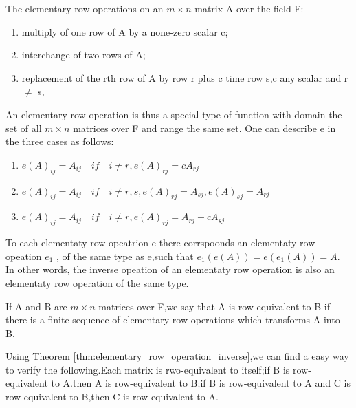 \begin{proposition}
The elementary row operations on an $m \times n$ matrix A over the field F:
\begin{enumerate}
	\item multiply of one row of A by a none-zero scalar c;
	\item interchange of two rows of A;
	\item replacement of the rth row of A by row r plus c time row s,c any scalar and r $\neq$ s,
\end{enumerate}
\end{proposition}
An elementary row operation is thus a special type of function with domain the set of all $m \times n$ matrices over F and range the same set.
One can describe e in the three cases as follows:
\begin{enumerate}
	\item $e(A)_{ij} = A_{ij} \quad if \quad  i \neq r ,e(A)_{rj} = cA_{rj}$
	\item $e(A)_{ij} = A_{ij} \quad if \quad  i \neq r,s ,e(A)_{rj} = A_{sj},e(A)_{sj} = A_{rj}$
	\item $e(A)_{ij} = A_{ij} \quad if \quad  i \neq r ,e(A)_{rj} = A_{rj}+cA_{sj}$
	      \label{eq:elementary_row_operations describe}
\end{enumerate}

\begin{theorem}
	To each elementaty row opeatrion e there corrspoonds an elementaty row opeation $e_1$ , of the
	same type as e,such that $e_1(e(A)) = e(e_1(A)) = A$. In other words, the inverse opeation  of an elementaty row operation is also an elementaty row operation of the same type.
	\label{thm:elementary_row_operation_inverse}
\end{theorem}

\begin{definition}
	If A and B are $m \times n$ matrices over F,we say that A is row equivalent to B if there is a finite sequence of elementary row operations which transforms A into B.
\end{definition}
\begin{remark}
	Using Theorem \ref{thm:elementary_row_operation_inverse},we can find a easy way to verify the following.Each matrix is rwo-equivalent to itself;if B is row-equivalent to A.then A is row-equivalent to B;if B is row-equivalent to A and C is row-equivalent to B,then C is row-equivalent to A.

\end{remark}


